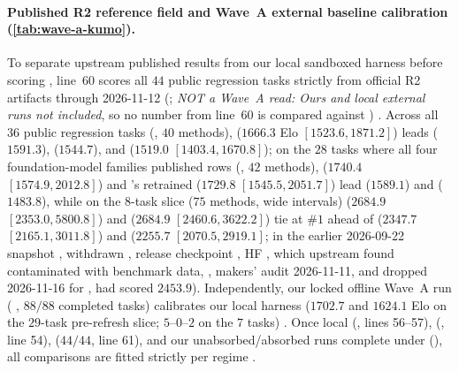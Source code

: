 \paragraph{Published R2 reference field and Wave~A external baseline calibration (\cref{tab:wave-a-kumo}).}
To separate upstream published results from our local sandboxed harness before scoring \EZ{},  line~60 scores all $44$ public regression tasks strictly from official  R2 artifacts through 2026-11-12 (; \emph{NOT a Wave~A read: Ours and local external runs not included}, so no number from line~60 is compared against \EZ{}) \est{}. Across all $36$  public regression tasks (, $40$ methods),  ($1666.3$ Elo $[1523.6, 1871.2]$) leads  ($1591.3$),  ($1544.7$), and  ($1519.0$ $[1403.4, 1670.8]$); on the $28$  tasks where all four foundation-model families published rows (, $42$ methods),  ($1740.4$ $[1574.9, 2012.8]$) and 's retrained  ($1729.8$ $[1545.5, 2051.7]$) lead  ($1589.1$) and  ($1483.8$), while on the $8$-task  slice ($75$ methods, wide intervals)  ($2684.9$ $[2353.0, 5800.8]$) and  ($2684.9$ $[2460.6, 3622.2]$) tie at $\#1$ ahead of  ($2347.7$ $[2165.1, 3011.8]$) and  ($2255.7$ $[2070.5, 2919.1]$; in the earlier 2026-09-22 snapshot , withdrawn , release checkpoint , HF , which upstream found contaminated with benchmark data, , makers' audit 2026-11-11, and  dropped 2026-11-16 for , had scored $2453.9$). Independently, our locked offline Wave~A run ( , $88/88$ completed tasks) calibrates our local harness ($1702.7$ and $1624.1$ Elo on the $29$-task pre-refresh slice; $5$--$0$--$2$ on the $7$  tasks) \est{}. Once local  (, lines 56--57),  (, line 54),  ($44/44$, line 61), and our unabsorbed/absorbed runs complete under  (), all \EZ{} comparisons are fitted strictly per regime \pre{}.
